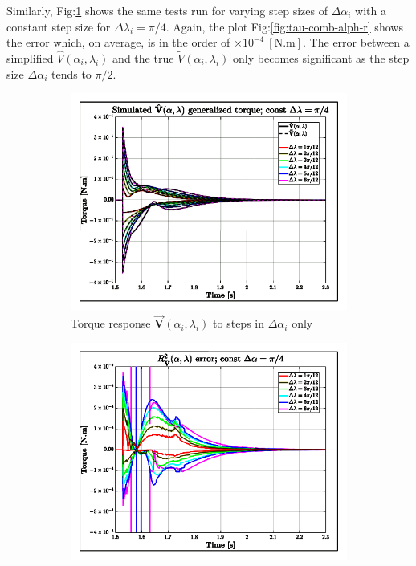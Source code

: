\par
Similarly, Fig:\ref{fig:tau-comb-alph} shows the same tests run for varying step sizes of $\Delta\alpha_i$ with a constant step size for $\Delta\lambda_i=\pi/4$. Again, the plot Fig:\ref{fig:tau-comb-alph-r} shows the error which, on average, is in the order of $\times 10^{-4}~[\text{N.m}]$. The error between a simplified $\hat{V}(\alpha_i,\lambda_i)$ and the true $\widetilde{V}(\alpha_i,\lambda_i)$ only becomes significant as the step size $\Delta\alpha_i$ tends to $\pi/2$.
\begin{figure}[htbp]
\vspace{-10pt}
\centering
\begin{subfigure}{0.49\textwidth}
\centering
\includegraphics[width=\textwidth]{graphs/tau-comb-alph}
\caption{Torque response $\vec{\mathbf{V}}(\alpha_i,\lambda_i)$ to steps in $\Delta\alpha_i$ only}
\label{fig:tau-comb-alph}
\end{subfigure}
\begin{subfigure}{0.49\textwidth}
\centering
\includegraphics[width=\textwidth]{graphs/tau-comb-alph-r}

\end{subfigure}
\end{figure}
